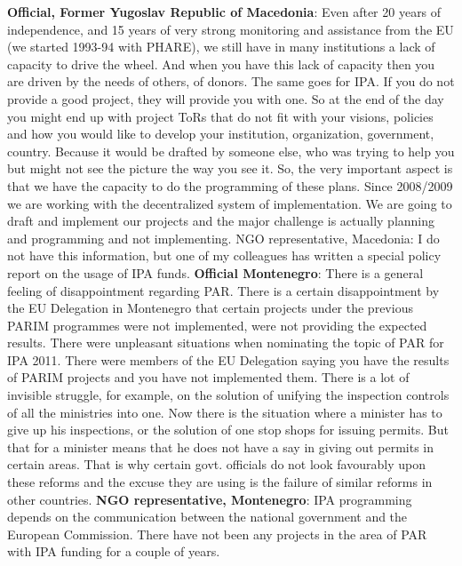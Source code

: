 \textbf{Official, Former Yugoslav Republic of Macedonia}: Even after 20 years of independence, and 15 years of very strong monitoring and assistance from the EU (we started 1993-94 with PHARE), we still have in many institutions a lack of capacity to drive the wheel. And when you have this lack of capacity then you are driven by the needs of others, of donors. The same goes for IPA. If you do not provide a good project, they will provide you with one. So at the end of the day you might end up with project ToRs that do not fit with your visions, policies and how you would like to develop your institution, organization, government, country. Because it would be drafted by someone else, who was trying to help you but might not see the picture the way you see it. So, the very important aspect is that we have the capacity to do the programming of these plans. Since 2008/2009 we are working with the decentralized system of implementation. We are going to draft and implement our projects and the major challenge is actually planning and programming and not implementing.
NGO representative, Macedonia: I do not have this information, but one of my colleagues has written a special policy report on the usage of IPA funds. 
\textbf{Official Montenegro}: There is a general feeling of disappointment regarding  PAR. There is a certain disappointment by the EU Delegation in Montenegro that certain projects under the previous PARIM programmes were not implemented, were not providing the expected results. There were unpleasant situations when nominating the topic of PAR for IPA 2011. There were members of the EU Delegation saying you have the results of PARIM projects and you have not implemented them. There is a lot of invisible struggle, for example, on the solution of unifying the inspection controls of all the ministries into one. Now there is the situation where a minister has to give up his inspections, or the solution of one stop shops for issuing permits. But that for a minister means that he does not have a say in giving out permits in certain areas. That is why certain govt. officials do not look favourably upon these reforms and the excuse they are using is the failure of similar reforms in other countries.
\textbf{NGO representative, Montenegro}: IPA programming depends on the communication between the national government and the European Commission. There have not been any projects in the area of PAR with IPA funding for a couple of years.%

